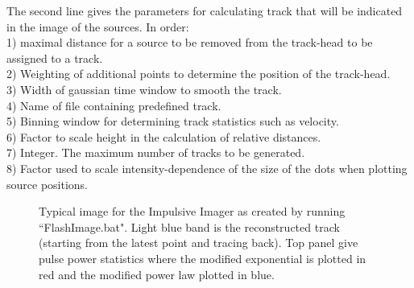 The second line gives the parameters for calculating track that will be indicated in the image of the sources. In order:
\\1) maximal distance for a source to be removed from the track-head to be assigned to a track.
\\2) Weighting of additional points to determine the position of the track-head.
\\3) Width of gaussian time window to smooth the track.
\\4) Name of file containing predefined track.
\\5) Binning window for determining track statistics such as velocity.
\\6) Factor to scale height in the calculation of relative distances.
\\7) Integer. The maximum number of tracks to be generated.
\\8) Factor used to scale intensity-dependence of the size of the dots when plotting source positions.

\begin{figure}[th]
	\caption{Typical image for the Impulsive Imager as created by running ``FlashImage.bat". Light blue band is the reconstructed track (starting from the latest point and tracing back). Top panel give pulse power statistics where the modified exponential is plotted in red and the modified power law plotted in blue.}	 
\end{figure}

